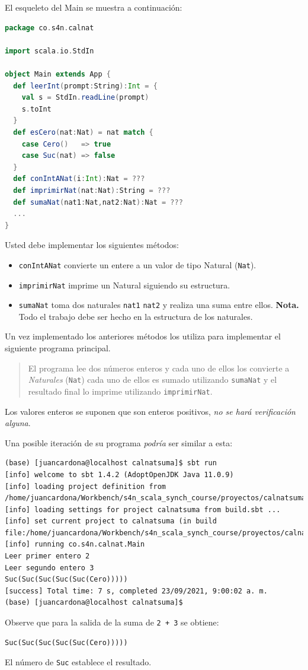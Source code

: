 \documentclass[12pt]{article}
\begin{document}
El esqueleto del Main se muestra a continuación:

\begin{lstlisting}[language=Scala]
package co.s4n.calnat

import scala.io.StdIn

object Main extends App {
  def leerInt(prompt:String):Int = {
    val s = StdIn.readLine(prompt)
    s.toInt
  }
  def esCero(nat:Nat) = nat match {
    case Cero()   => true
    case Suc(nat) => false
  }
  def conIntANat(i:Int):Nat = ???
  def imprimirNat(nat:Nat):String = ???
  def sumaNat(nat1:Nat,nat2:Nat):Nat = ??? 
  ...
}
\end{lstlisting}

Usted debe implementar los siguientes métodos:
\begin{itemize}
\item \texttt{conIntANat} convierte un entere a un valor de tipo Natural (\texttt{Nat}).
\item \texttt{imprimirNat} imprime un Natural siguiendo su estructura.
\item \texttt{sumaNat} toma dos naturales \texttt{nat1} \texttt{nat2} y realiza una suma entre ellos. \textbf{Nota.} Todo el trabajo
  debe ser hecho en la estructura de los naturales.
\end{itemize}

Un vez implementado los anteriores métodos los utiliza para implementar el siguiente programa principal.

\begin{quote}
  El programa lee dos números enteros y cada uno de ellos los convierte a \emph{Naturales} (\texttt{Nat}) cada uno de ellos es
  sumado utilizando \texttt{sumaNat} y el resultado final lo imprime utilizando \texttt{imprimirNat}.
\end{quote}

Los valores enteros se suponen que son enteros positivos, \emph{no se hará verificación alguna}.

Una posible iteración de su programa \emph{podría} ser similar a esta:

{\footnotesize
\begin{verbatim}
(base) [juancardona@localhost calnatsuma]$ sbt run 
[info] welcome to sbt 1.4.2 (AdoptOpenJDK Java 11.0.9)
[info] loading project definition from /home/juancardona/Workbench/s4n_scala_synch_course/proyectos/calnatsuma/project
[info] loading settings for project calnatsuma from build.sbt ...
[info] set current project to calnatsuma (in build file:/home/juancardona/Workbench/s4n_scala_synch_course/proyectos/calnatsuma/)
[info] running co.s4n.calnat.Main 
Leer primer entero 2
Leer segundo entero 3
Suc(Suc(Suc(Suc(Suc(Cero)))))
[success] Total time: 7 s, completed 23/09/2021, 9:00:02 a. m.
(base) [juancardona@localhost calnatsuma]$ 
\end{verbatim}
}

Observe que para la salida de la suma de \texttt{2 + 3} se obtiene:

\begin{verbatim}
Suc(Suc(Suc(Suc(Suc(Cero)))))
\end{verbatim}

El número de \texttt{Suc} establece el resultado.

% 
% 
\end{document}
